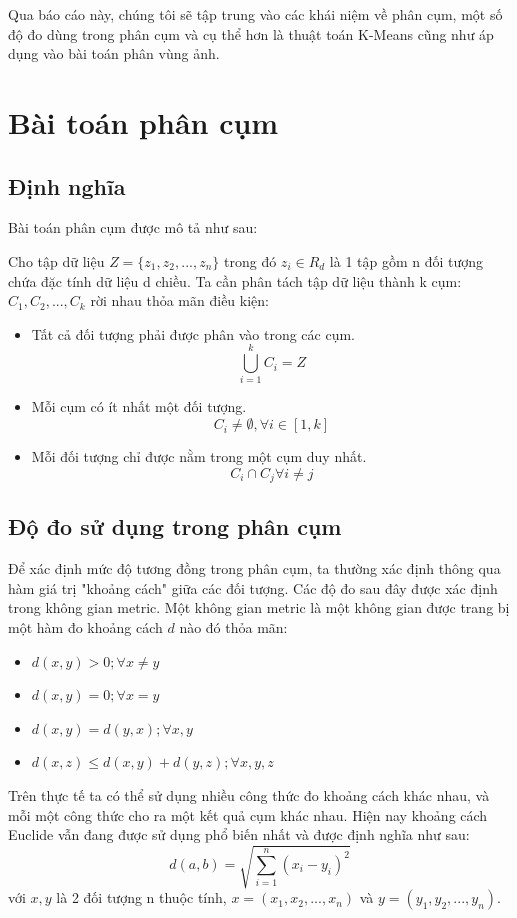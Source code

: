 \documentclass{article}
\begin{document}
    Qua báo cáo này, chúng tôi sẽ tập trung vào các khái niệm về phân cụm, một số độ đo dùng trong phân cụm và cụ thể hơn là thuật toán K-Means cũng như áp dụng vào bài toán phân vùng ảnh.
    \newpage

    \section{Bài toán phân cụm}
    \label{sec:clustering}
    \subsection{Định nghĩa}
    Bài toán phân cụm được mô tả như sau:

    Cho tập dữ liệu $Z=\{z_1, z_2, ..., z_n\}$ trong đó $z_i \in R_d$ là 1 tập gồm n đối tượng chứa đặc tính dữ liệu d chiều. Ta cần phân tách tập dữ liệu thành k cụm: $C_1, C_2,...,C_k$ rời nhau thỏa mãn điều kiện: 
    \begin{itemize}
        \item Tất cả đối tượng phải được phân vào trong các cụm.
        $$\bigcup\limits_{i=1}^{k} C_i = Z$$
        \item Mỗi cụm có ít nhất một đối tượng.
        $$C_i \neq \emptyset, \forall i \in [1,k] $$
        \item Mỗi đối tượng chỉ được nằm trong một cụm duy nhất.
        $$C_i \cap C_j \forall i \neq j$$
    \end{itemize}

    \subsection{Độ đo sử dụng trong phân cụm}
    Để xác định mức độ tương đồng trong phân cụm, ta thường xác định thông qua hàm giá trị "khoảng cách" giữa các đối tượng. Các độ đo sau đây được xác định trong không gian metric. Một không gian metric là một không gian được trang bị một hàm đo khoảng cách $d$ nào đó thỏa mãn:
    \begin{itemize}
        \item $d(x,y) > 0;\forall x \neq y$
        \item $d(x,y) = 0;\forall x = y$
        \item $d(x,y) = d(y,x);\forall x,y$
        \item $ d(x,z)\leq d(x,y) + d(y,z);\forall x,y,z$
    \end{itemize}
    
    Trên thực tế ta có thể sử dụng nhiều công thức đo khoảng cách khác nhau, và mỗi một công thức cho ra một kết quả cụm khác nhau. Hiện nay khoảng cách Euclide vẫn đang được sử dụng phổ biến nhất và được định nghĩa như sau:
    $$d(a,b) = \sqrt{\sum\limits_{i=1}^n (x_i-y_i)^2}$$ 
    với $x, y$ là 2 đối tượng n thuộc tính, $x=(x_1,x_2,...,x_n)$ và $y=(y_1,y_2,...,y_n)$.
\end{document}

